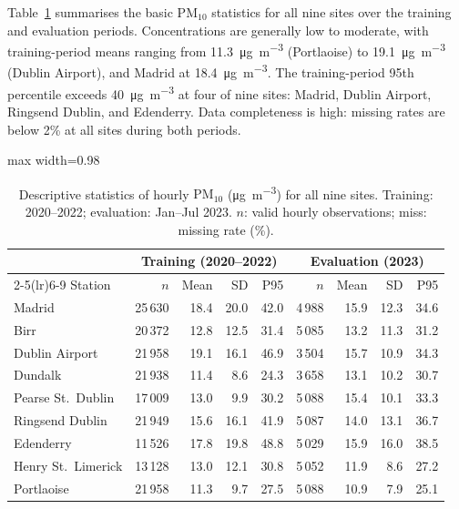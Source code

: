\documentclass[pdflatex,sn-basic,iicol]{sn-jnl}
\newcommand{\PMten}{\ensuremath{\mathrm{PM}_{10}}}
\begin{document}
Table~\ref{tab:descriptive} summarises the basic \PMten{} statistics for all
nine sites over the training and evaluation periods.  Concentrations are
generally low to moderate, with training-period means ranging from
11.3~\si{\micro\gram\per\cubic\metre} (Portlaoise) to
19.1~\si{\micro\gram\per\cubic\metre} (Dublin Airport), and Madrid at
18.4~\si{\micro\gram\per\cubic\metre}.  The training-period 95th percentile
exceeds 40~\si{\micro\gram\per\cubic\metre} at four of nine sites: Madrid,
Dublin Airport, Ringsend Dublin, and Edenderry.
Data completeness is high: missing rates are below 2\% at all
sites during both periods.

\begin{table}[!t]
\centering
\caption{Descriptive statistics of hourly \PMten{}
  (\si{\micro\gram\per\cubic\metre}) for all nine sites.
  Training: 2020--2022; evaluation: Jan--Jul 2023.
  $n$: valid hourly observations; miss: missing rate (\%).}
\label{tab:descriptive}
\small
\begin{adjustbox}{max width=0.98\textwidth}
\begin{tabular}{lrrrrrrrr}
\toprule
 & \multicolumn{4}{c}{Training (2020--2022)} & \multicolumn{4}{c}{Evaluation (2023)} \\
\cmidrule(lr){2-5}\cmidrule(lr){6-9}
Station & $n$ & Mean & SD & P95 & $n$ & Mean & SD & P95 \\
\midrule
Madrid              & 25\,630 & 18.4 & 20.0 & 42.0 & 4\,988 & 15.9 & 12.3 & 34.6 \\
\midrule
Birr                & 20\,372 & 12.8 & 12.5 & 31.4 & 5\,085 & 13.2 & 11.3 & 31.2 \\
Dublin Airport      & 21\,958 & 19.1 & 16.1 & 46.9 & 3\,504 & 15.7 & 10.9 & 34.3 \\
Dundalk             & 21\,938 & 11.4 &  8.6 & 24.3 & 3\,658 & 13.1 & 10.2 & 30.7 \\
Pearse St.\ Dublin  & 17\,009 & 13.0 &  9.9 & 30.2 & 5\,088 & 15.4 & 10.1 & 33.3 \\
Ringsend Dublin     & 21\,949 & 15.6 & 16.1 & 41.9 & 5\,087 & 14.0 & 13.1 & 36.7 \\
Edenderry           & 11\,526 & 17.8 & 19.8 & 48.8 & 5\,029 & 15.9 & 16.0 & 38.5 \\
Henry St.\ Limerick & 13\,128 & 13.0 & 12.1 & 30.8 & 5\,052 & 11.9 &  8.6 & 27.2 \\
Portlaoise          & 21\,958 & 11.3 &  9.7 & 27.5 & 5\,088 & 10.9 &  7.9 & 25.1 \\
\bottomrule
\end{tabular}
\end{adjustbox}
\end{table}
\end{document}
